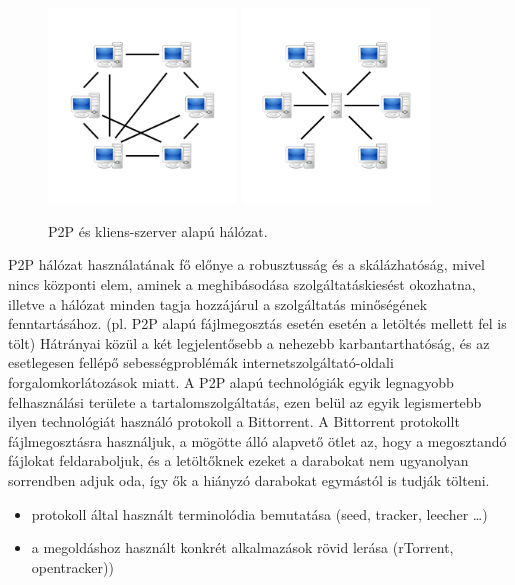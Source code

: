 \begin{figure}[!ht]
	\centering
	\includegraphics[width=50mm, keepaspectratio]{figures/P2P-network.png}\hspace{1cm}
	\includegraphics[width=50mm, keepaspectratio]{figures/Server-based-network.png}
	\caption{P2P és kliens-szerver alapú hálózat.}%
	\label{fig:networkcomparison}
\end{figure}

P2P hálózat használatának fő előnye a robusztusság és a skálázhatóság, mivel nincs központi elem,
aminek a meghibásodása szolgáltatáskiesést okozhatna, illetve a hálózat minden tagja hozzájárul a
szolgáltatás minőségének fenntartásához. (pl. P2P alapú fájlmegosztás esetén esetén a letöltés
mellett fel is tölt) Hátrányai közül a két legjelentősebb a nehezebb karbantarthatóság, és az
esetlegesen fellépő sebességproblémák internetszolgáltató-oldali forgalomkorlátozások miatt.
A P2P alapú technológiák egyik legnagyobb felhasználási területe a tartalomszolgáltatás, ezen belül
az egyik legismertebb ilyen technológiát használó protokoll a Bittorrent. A Bittorrent protokollt
fájlmegosztásra használjuk, a mögötte álló alapvető ötlet az, hogy a megosztandó fájlokat
feldaraboljuk, és a letöltőknek ezeket a darabokat nem ugyanolyan sorrendben adjuk oda, így ők a
hiányzó darabokat egymástól is tudják tölteni. 

\begin{itemize}
  \item protokoll által használt terminolódia bemutatása (seed, tracker, leecher \ldots)
  \item a megoldáshoz használt konkrét alkalmazások rövid lerása (rTorrent, opentracker))
\end{itemize}

